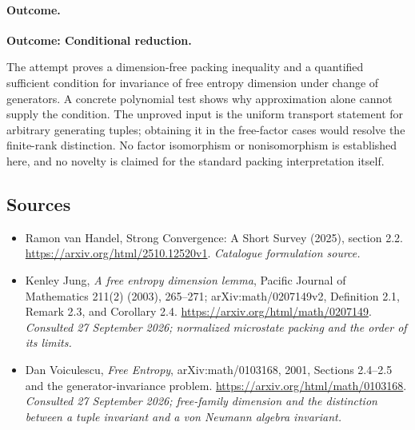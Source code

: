 \documentclass[11pt,a4paper]{article}
\numberwithin{equation}{section}
\begin{document}
\paragraph{Outcome.}
\textbf{Outcome: Conditional reduction.}

The attempt proves a dimension-free packing inequality and a quantified
sufficient condition for invariance of free entropy dimension under change
of generators. A concrete polynomial test shows why approximation alone
cannot supply the condition. The unproved input is the uniform transport
statement for arbitrary generating tuples; obtaining it in the free-factor
cases would resolve the finite-rank distinction. No factor isomorphism or
nonisomorphism is established here, and no novelty is claimed for the
standard packing interpretation itself.
\subsection{Sources}
\begin{itemize}\raggedright
\item[\textnormal{[S1]}]\hypertarget{source:statement:1}{} Ramon van Handel, Strong Convergence: A Short Survey (2025), section 2.2.
\url{https://arxiv.org/html/2510.12520v1}.
{\small\textit{Catalogue formulation source.}}
\item[\textnormal{[E1]}]\hypertarget{extra:statement:1}{} Kenley Jung,
\emph{A free entropy dimension lemma}, Pacific Journal of Mathematics
211(2) (2003), 265--271; arXiv:math/0207149v2,
Definition 2.1, Remark 2.3, and Corollary 2.4.
\url{https://arxiv.org/html/math/0207149}.
{\small\textit{Consulted 27 September 2026; normalized microstate packing
and the order of its limits.}}
\item[\textnormal{[E2]}]\hypertarget{extra:statement:2}{} Dan Voiculescu,
\emph{Free Entropy}, arXiv:math/0103168, 2001,
Sections 2.4--2.5 and the generator-invariance problem.
\url{https://arxiv.org/html/math/0103168}.
{\small\textit{Consulted 27 September 2026; free-family dimension and the
distinction between a tuple invariant and a von Neumann algebra invariant.}}
\end{itemize}
\end{document}
